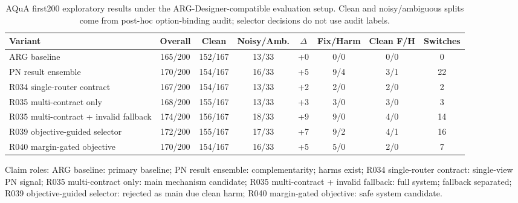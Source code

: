 \begin{table}[t]
\centering
\caption{AQuA first200 exploratory results under the ARG-Designer-compatible evaluation setup. Clean and noisy/ambiguous splits come from post-hoc option-binding audit; selector decisions do not use audit labels.}
\label{tab:aqua_first200_main_results}
\small
\begin{tabular}{lccccccc}
\toprule
Variant & Overall & Clean & Noisy/Amb. & $\Delta$ & Fix/Harm & Clean F/H & Switches \\
\midrule
ARG baseline & 165/200 & 152/167 & 13/33 & +0 & 0/0 & 0/0 & 0 \\
PN result ensemble & 170/200 & 154/167 & 16/33 & +5 & 9/4 & 3/1 & 22 \\
R034 single-router contract & 167/200 & 154/167 & 13/33 & +2 & 2/0 & 2/0 & 2 \\
R035 multi-contract only & 168/200 & 155/167 & 13/33 & +3 & 3/0 & 3/0 & 3 \\
R035 multi-contract + invalid fallback & 174/200 & 156/167 & 18/33 & +9 & 9/0 & 4/0 & 14 \\
R039 objective-guided selector & 172/200 & 155/167 & 17/33 & +7 & 9/2 & 4/1 & 16 \\
R040 margin-gated objective & 170/200 & 154/167 & 16/33 & +5 & 5/0 & 2/0 & 7 \\
\bottomrule
\end{tabular}

\vspace{0.25em}
\begin{minipage}{0.97\textwidth}
\footnotesize Claim roles: ARG baseline: primary baseline; PN result ensemble: complementarity; harms exist; R034 single-router contract: single-view PN signal; R035 multi-contract only: main mechanism candidate; R035 multi-contract + invalid fallback: full system; fallback separated; R039 objective-guided selector: rejected as main due clean harm; R040 margin-gated objective: safe system candidate.
\end{minipage}
\end{table}
